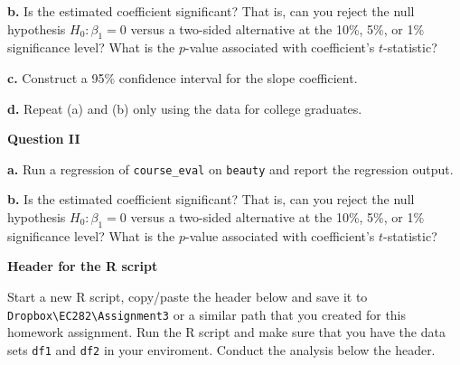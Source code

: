 \documentclass[]{book}
\begin{document}
\textbf{b.} Is the estimated coefficient significant? That is, can you
reject the null hypothesis \(H_0: \beta_1 = 0\) versus a two-sided
alternative at the 10\%, 5\%, or 1\% significance level? What is the
\(p\)-value associated with coefficient's \(t\)-statistic?

\textbf{c.} Construct a 95\% confidence interval for the slope
coefficient.

\textbf{d.} Repeat (a) and (b) only using the data for college
graduates.

\textbf{Question II}

\textbf{a.} Run a regression of \texttt{course\_eval} on \texttt{beauty}
and report the regression output.

\textbf{b.} Is the estimated coefficient significant? That is, can you
reject the null hypothesis \(H_0: \beta_1 = 0\) versus a two-sided
alternative at the 10\%, 5\%, or 1\% significance level? What is the
\(p\)-value associated with coefficient's \(t\)-statistic?

\textbf{Header for the R script}

Start a new R script, copy/paste the header below and save it to
\texttt{Dropbox\textbackslash{}EC282\textbackslash{}Assignment3} or a
similar path that you created for this homework assignment. Run the R
script and make sure that you have the data sets \texttt{df1} and
\texttt{df2} in your enviroment. Conduct the analysis below the header.
\end{document}
